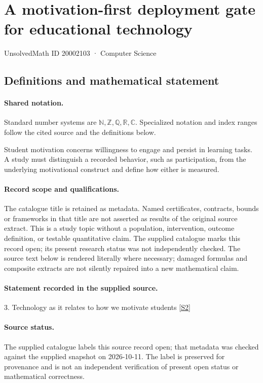 \documentclass[11pt]{article}
\newcommand{\sref}[2]{\hyperlink{source:#1:#2}{[S#2]}}
\begin{document}
\setcounter{section}{20002102}
\section{A motivation-first deployment gate for educational technology}\label{20002103}
{\small\sffamily UnsolvedMath ID 20002103 · Computer Science}
\subsection{Definitions and mathematical statement}

\paragraph{Shared notation.}Standard number systems are $\mathbb N,\mathbb Z,\mathbb Q,\mathbb R,\mathbb C$. Specialized notation and index ranges follow the cited source and the definitions below.


Student motivation concerns willingness to engage and persist in learning tasks. A study must distinguish a recorded behavior, such as participation, from the underlying motivational construct and define how either is measured.
\paragraph{Record scope and qualifications.}
The catalogue title is retained as metadata. Named certificates, contracts, bounds or frameworks in that title are not asserted as results of the original source extract.
This is a study topic without a population, intervention, outcome definition, or testable quantitative claim. The supplied catalogue marks this record open; its present research status was not independently checked.
The source text below is rendered literally where necessary; damaged formulas and composite extracts are not silently repaired into a new mathematical claim.
\paragraph{Statement recorded in the supplied source.}
3. Technology as it relates to how we motivate students \sref{20002103}{2}
\paragraph{Source status.}
The supplied catalogue labels this source record open; that metadata was checked against the supplied snapshot on 2026-10-11. The label is preserved for provenance and is not an independent verification of present open status or mathematical correctness.
\end{document}

